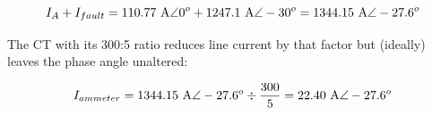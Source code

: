 $$I_A + I_{fault} = 110.77 \hbox{ A} \angle 0^o + 1247.1 \hbox{ A} \angle -30^o = 1344.15 \hbox{ A} \angle -27.6^o$$

The CT with its 300:5 ratio reduces line current by that factor but (ideally) leaves the phase angle unaltered:

$$I_{ammeter} = 1344.15 \hbox{ A} \angle -27.6^o \div {300 \over 5} = 22.40 \hbox{ A} \angle -27.6^o$$







